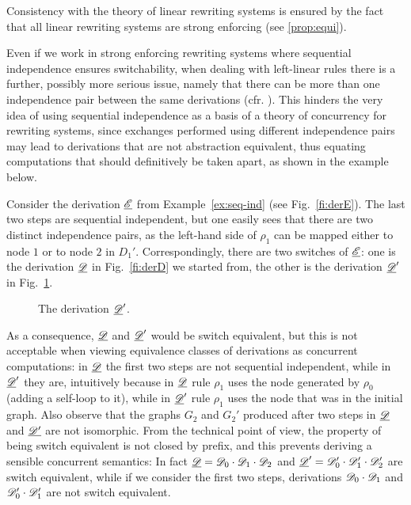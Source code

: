 Consistency with the theory of linear rewriting systems is ensured by the fact that all linear rewriting systems are strong enforcing (see \cref{prop:equi}).



Even if we work in strong enforcing rewriting systems where sequential
independence ensures switchability, when dealing with left-linear
rules there is a further, possibly more serious issue, 
namely that there can be more than one independence pair between
the same derivations (cfr. ). This hinders the very idea of using
sequential independence as a basis of a theory of concurrency for
rewriting systems, since exchanges performed using different
independence pairs may lead to derivations that are not abstraction
equivalent, thus equating computations that should
definitively be taken apart, as shown in the example below.

\begin{example}
	Consider the derivation $\underline{\mathscr{E}}$ from Example~\ref{ex:seq-ind} (see Fig.~\ref{fi:derE}).
	The last two steps are sequential independent, but one easily sees
	that there are two distinct independence pairs, as the left-hand side
	of $\rho_1$ can be mapped either to node $1$ or to node
	$2$ in $D_1'$. Correspondingly, there
	are two switches of $\underline{\mathscr{E}}$: one is the derivation $\underline{\mathscr{D}}$ in
	Fig.~\ref{fi:derD} we started from, the other is the derivation
	$\underline{\mathscr{D}}'$ in Fig.~\ref{fi:derD1}.
	
	\begin{figure}
%		
		\caption{The derivation $\underline{\mathscr{D}}'$.}
		\label{fi:derD1}
	\end{figure}
	
	As a consequence, $\underline{\mathscr{D}}$ and $\underline{\mathscr{D}}'$ would be switch
	equivalent, but this is not acceptable when viewing equivalence
	classes of derivations as concurrent computations: in $\underline{\mathscr{D}}$ the
	first two steps are not sequential independent, while in $\underline{\mathscr{D}}'$
	they are, intuitively because in $\underline{\mathscr{D}}$ rule $\rho_1$ uses the
	node generated by $\rho_0$ (adding a self-loop to it), while in
	$\underline{\mathscr{D}}'$ rule $\rho_1$ uses the node that was in the initial
	graph. Also observe that the graphs $G_2$ and $G_2'$ produced after
	two steps in $\underline{\mathscr{D}}$ and $\underline{\mathscr{D'}}$ are not isomorphic. From the
	technical point of view, the property of being switch equivalent is
	not closed by prefix, and this prevents deriving a sensible
	concurrent semantics: In fact
	$\underline{\mathscr{D}} = \mathscr{D}_0\cdot \mathscr{D}_1 \cdot \mathscr{D}_2$ and
	$\underline{\mathscr{D}}' = \mathscr{D}_0'\cdot \mathscr{D}_1' \cdot \mathscr{D}_2'$ are
	switch equivalent, while if we consider the first two steps,
	derivations $\mathscr{D}_0 \cdot \mathscr{D}_1$ and
	$\mathscr{D}_0' \cdot \mathscr{D}_1'$ are not switch equivalent.
\end{example} 


